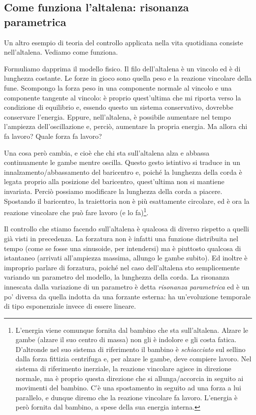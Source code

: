 \documentclass[a4paper,openany]{article}
\begin{document}
	
	\subsection{Come funziona l'altalena: risonanza parametrica}
	Un altro esempio di teoria del controllo applicata nella vita quotidiana consiste nell'altalena. Vediamo come funziona.
	
	Formuliamo dapprima il modello fisico.
	Il filo dell'altalena è un vincolo ed è di lunghezza costante. Le forze in gioco sono quella peso e la reazione vincolare della fune. Scompongo la forza peso in una componente normale al vincolo e una componente tangente al vincolo: è proprio quest'ultima che mi riporta verso la condizione di equilibrio e, essendo questo un sistema conservativo, dovrebbe conservare l'energia. Eppure, nell'altalena, è possibile aumentare nel tempo l'ampiezza dell'oscillazione e, perciò, aumentare la propria energia. Ma allora chi fa lavoro? Quale forza fa lavoro?
	
	Una cosa però cambia, e cioè che chi sta sull'altalena alza e abbassa continuamente le gambe mentre oscilla. Questo gesto istintivo si traduce in un innalzamento/abbassamento del baricentro e, poiché la lunghezza della corda è legata proprio alla posizione del baricentro, quest'ultima non si mantiene invariata. Perciò possiamo modificare la lunghezza della corda a piacere. Spostando il baricentro, la traiettoria non è più esattamente circolare, ed è ora la reazione vincolare che può fare lavoro (e lo fa)\footnote{L'energia viene comunque fornita dal bambino che sta sull'altalena. Alzare le gambe (alzare il suo centro di massa) non gli è indolore e gli costa fatica. D'altronde nel suo sistema di riferimento il bambino è \textit{schiacciato} sul sellino dalla forza fittizia centrifuga e, per alzare le gambe, deve compiere lavoro. Nel sistema di riferimento inerziale, la reazione vincolare agisce in direzione normale, ma è proprio questa direzione che si allunga/accorcia in seguito ai movimenti del bambino. C'è una spostamento in seguito ad una forza a lui parallelo, e dunque diremo che la reazione vincolare fa lavoro. L'energia è però fornita dal bambino, a spese della sua energia interna.}.
	
	
	Il controllo che stiamo facendo sull'altalena è qualcosa di diverso rispetto a quelli già visti in precedenza. La forzatura non è infatti una funzione distribuita nel tempo (come se fosse una sinusoide, per intendersi) ma è piuttosto qualcosa di istantaneo (arrivati all'ampiezza massima, allungo le gambe subito). Ed inoltre è improprio parlare di forzatura, poiché nel caso dell'altalena sto semplicemente variando un parametro del modello, la lunghezza della corda. La risonanza innescata dalla variazione di un parametro è detta \textit{risonanza parametrica} ed è un po' diversa da quella indotta da una forzante esterna: ha un'evoluzione temporale di tipo esponenziale invece di essere lineare.
	
\end{document}
